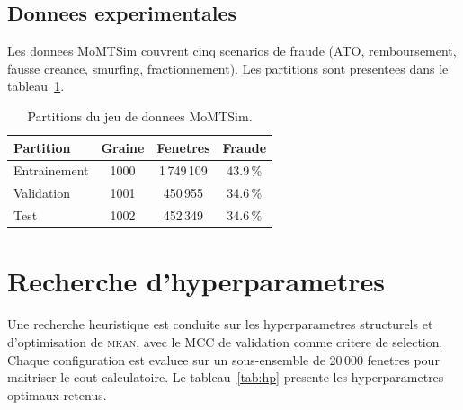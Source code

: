 \documentclass[11pt,a4paper,twocolumn]{article}
\newcommand{\MKAN}{\textsc{mkan}}
\begin{document}
\subsection{Donnees experimentales}

Les donnees MoMTSim \cite{lopez2022momtsim} couvrent cinq scenarios
de fraude (ATO, remboursement, fausse creance, smurfing, fractionnement).
Les partitions sont presentees dans le tableau~\ref{tab:data}.

\begin{table}[H]
\centering
\caption{Partitions du jeu de donnees MoMTSim.}
\label{tab:data}
\renewcommand{\arraystretch}{1.2}
\small
\begin{tabular}{lccc}
\toprule
\textbf{Partition} & \textbf{Graine} & \textbf{Fenetres} & \textbf{Fraude} \\
\midrule
Entrainement & 1000 & 1\,749\,109 & 43.9\,\% \\
Validation   & 1001 &   450\,955  & 34.6\,\% \\
Test         & 1002 &   452\,349  & 34.6\,\% \\
\bottomrule
\end{tabular}
\end{table}

\section{Recherche d'hyperparametres}

Une recherche heuristique est conduite sur les hyperparametres
structurels et d'optimisation de \MKAN{}, avec le MCC de validation
comme critere de selection. Chaque configuration est evaluee sur
un sous-ensemble de 20\,000 fenetres pour maitriser le cout
calculatoire. Le tableau~\ref{tab:hp} presente les hyperparametres
optimaux retenus.
\end{document}
